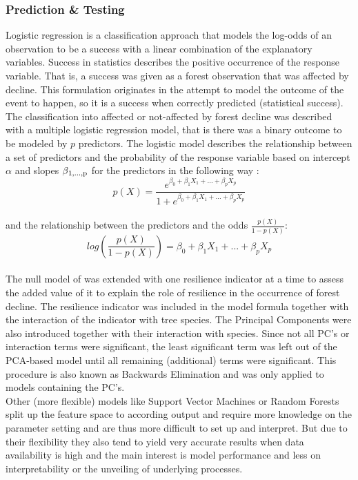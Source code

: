 \subsubsection{Prediction \& Testing}
Logistic regression is a classification approach that models the log-odds of an observation to be a success with a linear combination of the explanatory variables. Success in statistics describes the positive occurrence of the response variable. That is, a success was given as a forest observation that was affected by decline. This formulation originates in the attempt to model the outcome of the event to happen, so it is a success when correctly predicted (statistical success). The classification into affected or not-affected by forest decline was described with a multiple logistic regression model, that is there was a binary outcome to be modeled by $p$ predictors. The logistic model describes the relationship between a set of predictors and the probability of the response variable based on intercept $\alpha$ and slopes $\beta\textsubscript{1,...,p}$ for the predictors in the following way \citep{james2013}:
\begin{equation}
	p(X) = \frac{e^{\beta_0 + \beta_1 X_1 + ... + \beta_p X_p}}{1 + e^{\beta_0 + \beta_1 X_1 + ... + \beta_p X_p}}
\end{equation}\\
and the relationship between the predictors and the odds $\frac{p(X)}{1 - p(X)}$:
\begin{equation}
	log(\frac{p(X)}{1 - p(X)}) = \beta_0 + \beta_1 X_1 + ... + \beta_p X_p
\end{equation}\\
The null model of \cite{chaparro2017} was extended with one resilience indicator at a time to assess the added value of it to explain the role of resilience in the occurrence of forest decline. The resilience indicator was included in the model formula together with the interaction of the indicator with tree species. The Principal Components were also introduced together with their interaction with species. Since not all PC's or interaction terms were significant, the least significant term was left out of the PCA-based model until all remaining (additional) terms were significant. This procedure is also known as Backwards Elimination and was only applied to models containing the PC's.\\
Other (more flexible) models like Support Vector Machines \citep{hearst1998} or Random Forests \citep{breiman1999} split up the feature space to according output and require more knowledge on the parameter setting and are thus more difficult to set up and interpret. But due to their flexibility they also tend to yield very accurate results when data availability is high and the main interest is model performance and less on interpretability or the unveiling of underlying processes.\\

